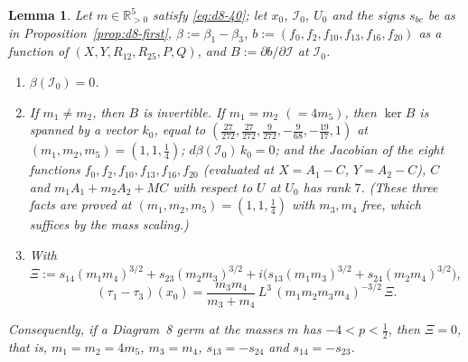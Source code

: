 \documentclass[Threeside,11pt]{article}
\newtheorem{lemma}[theorem]{Lemma}
\theoremstyle{definition}
\theoremstyle{remark}
\numberwithin{equation}{section}
\theoremstyle{remark}
\newcommand{\Rp}{\mathbb{R}_{>0}}
\newenvironment{alphalist}{\begin{enumerate}\renewcommand{\labelenumi}{(\alph{enumi})}%
  \renewcommand{\theenumi}{\alph{enumi}}}{\end{enumerate}}
\begin{document}
{\begin{lemma}\label{lem:d8-kappa}
Let $m\in\Rp^5$ satisfy \eqref{eq:d8-40}; let $x_0$, $\mathcal I_0$, $U_0$ and the signs
$s_{bc}$ be as in Proposition~\ref{prop:d8-first}, $\beta:=\beta_1-\beta_3$,
$b:=(f_0,f_2,f_{10},f_{13},f_{16},f_{20})$ as a function of
$(X,Y,R_{12},R_{25},P,Q)$, and $B:=\partial b/\partial\mathcal I$ at $\mathcal I_0$.
\begin{alphalist}
\item $\beta(\mathcal I_0)=0$.
\item If $m_1\ne m_2$, then $B$ is invertible.  If $m_1=m_2$ $(=4m_5)$, then $\ker B$ is spanned
by a vector $k_0$, equal to $(\frac{27}{272},\frac{27}{272},\frac9{272},-\frac9{68},-\frac{19}{17},1)$
at $(m_1,m_2,m_5)=(1,1,\frac14)$; $d\beta(\mathcal I_0)\,k_0=0$; and the Jacobian of the eight
functions $f_0,f_2,f_{10},f_{13},f_{16},f_{20}$ (evaluated at $X=A_1-C$, $Y=A_2-C$), $C$ and
$m_1A_1+m_2A_2+MC$ with respect to $U$ at $U_0$ has rank $7$.  (These three facts are proved
at $(m_1,m_2,m_5)=(1,1,\frac14)$ with $m_3,m_4$ free, which suffices by the mass scaling.)
\item With $\Xi:=s_{14}(m_1m_4)^{3/2}+s_{23}(m_2m_3)^{3/2}
+i\bigl(s_{13}(m_1m_3)^{3/2}+s_{24}(m_2m_4)^{3/2}\bigr)$,
\[
  (\tau_1-\tau_3)(x_0)=\frac{m_3m_4}{m_3+m_4}\,L^3\,(m_1m_2m_3m_4)^{-3/2}\,\Xi .
\]
\end{alphalist}
Consequently, if a Diagram~8 germ at the masses $m$ has $-4<p<\frac12$, then $\Xi=0$, that is,
$m_1=m_2=4m_5$, $m_3=m_4$, $s_{13}=-s_{24}$ and $s_{14}=-s_{23}$.
\end{lemma}}
\end{document}
